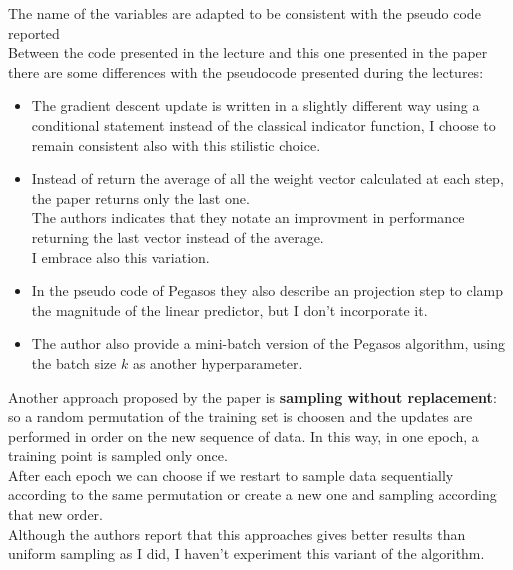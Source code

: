 The name of the variables are adapted to be consistent with the pseudo code reported\\
Between the code presented in the lecture and this one presented in the paper there are some differences with the pseudocode presented during the lectures:\\
\begin{itemize}
    \item The gradient descent update is written in a slightly different way using a conditional statement instead of the classical indicator function, I choose to remain consistent also with this stilistic choice.\\
    \item Instead of return the average of all the weight vector calculated at each step, the paper returns only the last one.\\ 
    The authors indicates that they notate an improvment in performance returning the last vector instead of the average.\\ 
    I embrace also this variation.\\
    \item In the pseudo code of Pegasos they also describe an projection step to clamp the magnitude of the linear predictor, but I don't incorporate it.\\ 
    \item The author also provide a mini-batch version of the Pegasos algorithm, using the batch size $k$ as another hyperparameter.\\
\end{itemize}

Another approach proposed by the paper is {\bf sampling without replacement}: so a random permutation of the training set is choosen and the updates are performed in order on the new sequence of data.
In this way, in one epoch, a training point is sampled only once.\\
After each epoch we can choose if we restart to sample data sequentially according to the same permutation or create a new one and sampling according that new order.\\
Although the authors report that this approaches gives better results than uniform sampling as I did, I haven't experiment this variant of the algorithm.\\


